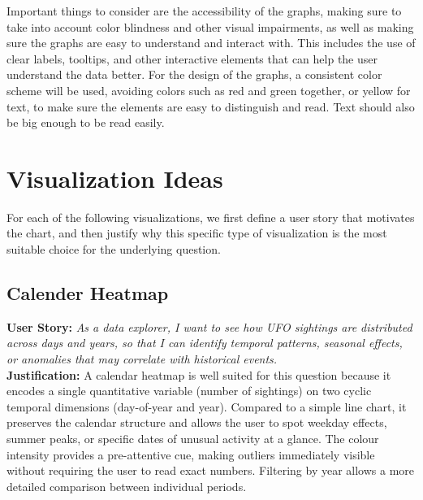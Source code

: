 \documentclass[fleqn,10pt]{SelfArx} %
\begin{document}
Important things to consider are the accessibility of the graphs, making sure to take into account color blindness and other visual impairments, as well as making sure the graphs are easy to understand and interact with.
This includes the use of clear labels, tooltips, and other interactive elements that can help the user understand the data better.
For the design of the graphs, a consistent color scheme will be used, avoiding colors such as red and green together, or yellow for text, to make sure the elements are easy to distinguish and read.
Text should also be big enough to be read easily.


\newpage
\section{Visualization Ideas}
For each of the following visualizations, we first define a user story that motivates the chart, and then justify why this specific type of visualization is the most suitable choice for the underlying question.

\subsection{Calender Heatmap}

\textbf{User Story:} \textit{As a data explorer, I want to see how UFO sightings are distributed across days and years, so that I can identify temporal patterns, seasonal effects, or anomalies that may correlate with historical events.}
\\
\textbf{Justification:} A calendar heatmap is well suited for this question because it encodes a single quantitative variable (number of sightings) on two cyclic temporal dimensions (day-of-year and year). Compared to a simple line chart, it preserves the calendar structure and allows the user to spot weekday effects, summer peaks, or specific dates of unusual activity at a glance. The colour intensity provides a pre-attentive cue, making outliers immediately visible without requiring the user to read exact numbers. Filtering by year allows a more detailed comparison between individual periods.
\end{document}

